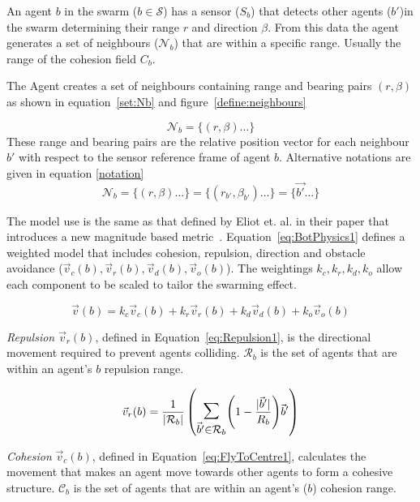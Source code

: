 \documentclass{ieeeaccess}
\newcommand{\card}[1]{\vert{#1}\vert}
\newcommand{\magn}[1]{\vert{#1}\vert}
\begin{document}
An agent $b$ in the swarm ($b\in\mathcal S$) has a sensor ($S_b$) that detects other agents
($b'$)in the swarm
determining their range $r$  and direction $\beta$.  From this data the agent generates a
set of neighbours ($\mathcal N_b$) that are within a specific range.  Usually the range of the
cohesion field $C_b$.

The Agent creates a set of neighbours containing range and bearing pairs
$(r,\beta)$ as shown in equation~\ref{set:Nb} and
figure~\ref{define:neighbours}

\begin{equation}
\mathcal N_b = \{ (r,\beta) \ldots \}
\label{set:Nb}
\end{equation}
These range and bearing pairs are the relative position vector for each
neighbour $b'$ with respect to the sensor reference frame of agent $b$.
Alternative notations are given in equation \ref{notation}
\begin{equation}
	\mathcal N_b = \{(r,\beta) \ldots \} = \{ (r_{b'}, \beta_{b'}) \ldots \} = \{
	\vec{b'} \ldots \}
	\label{notation}
\end{equation}

The model use is the same as that defined by Eliot et. al. in their paper that introduces a new magnitude based metric~\cite{EKB:18}. 
Equation~\ref{eq:BotPhysics1} defines a weighted model that includes cohesion,
repulsion, direction and obstacle avoidance ($\vec v_c(b), \vec v_r(b),
\vec v_d(b), \vec v_o(b)$). 
The weightings $k_c, k_r, k_d, k_o$ allow each component to be scaled to tailor the swarming effect. 

\begin{equation}\label{eq:BotPhysics1}
  \vec v(b) = k_c\vec v_c(b) + k_r\vec v_r(b) + k_d\vec v_d(b) + k_o\vec v_o(b)
\end{equation}

\textit{Repulsion} $\vec v_r(b)$, defined in Equation~\ref{eq:Repulsion1}, is the
directional movement required to prevent agents colliding. $\mathcal R_b$ is
the set of agents that are within an agent's $b$ repulsion range.

\begin{equation}\label{eq:Repulsion1}
\vec v_r(b) = 
\frac{1}{\card{\mathcal R_b}}
\left(
	\mathlarger{\mathlarger{\sum_{\vec b' \in \mathcal R_b}}}
	{\left( 1-\frac{\magn{\vec b'}}{R_b} \right)}
	\vec b'
\right)
\end{equation}

\textit{Cohesion} $\vec v_{c}(b)$, defined in Equation~\ref{eq:FlyToCentre1},
calculates the movement that makes an agent move towards other agents to form
a cohesive structure. $\mathcal C_b$ is the set of agents that are within an agent's ($b$) cohesion range.
\end{document}
